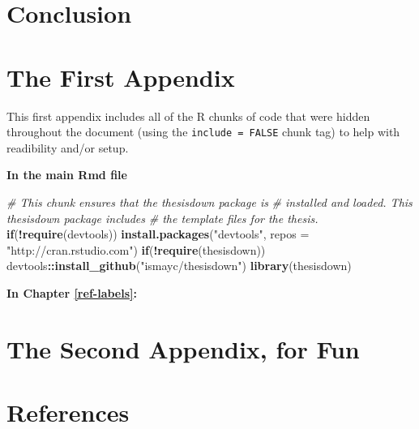 \documentclass[12pt,twoside]{reedthesis}
\newenvironment{Shaded}{\begin{snugshade}}{\end{snugshade}}
\newcommand{\CommentTok}[1]{\textcolor[rgb]{0.56,0.35,0.01}{\textit{#1}}}
\newcommand{\ControlFlowTok}[1]{\textcolor[rgb]{0.13,0.29,0.53}{\textbf{#1}}}
\newcommand{\DataTypeTok}[1]{\textcolor[rgb]{0.13,0.29,0.53}{#1}}
\newcommand{\KeywordTok}[1]{\textcolor[rgb]{0.13,0.29,0.53}{\textbf{#1}}}
\newcommand{\NormalTok}[1]{#1}
\newcommand{\OperatorTok}[1]{\textcolor[rgb]{0.81,0.36,0.00}{\textbf{#1}}}
\newcommand{\StringTok}[1]{\textcolor[rgb]{0.31,0.60,0.02}{#1}}
\begin{document}
\hypertarget{conclusion-2}{%
\chapter*{Conclusion}\label{conclusion-2}}

\appendix

\hypertarget{the-first-appendix}{%
\chapter{The First Appendix}\label{the-first-appendix}}

This first appendix includes all of the R chunks of code that were hidden throughout the document (using the \texttt{include\ =\ FALSE} chunk tag) to help with readibility and/or setup.

\textbf{In the main Rmd file}
\begin{Shaded}
\begin{Highlighting}[]
\CommentTok{# This chunk ensures that the thesisdown package is}
\CommentTok{# installed and loaded. This thesisdown package includes}
\CommentTok{# the template files for the thesis.}
\ControlFlowTok{if}\NormalTok{(}\OperatorTok{!}\KeywordTok{require}\NormalTok{(devtools))}
  \KeywordTok{install.packages}\NormalTok{(}\StringTok{"devtools"}\NormalTok{, }\DataTypeTok{repos =} \StringTok{"http://cran.rstudio.com"}\NormalTok{)}
\ControlFlowTok{if}\NormalTok{(}\OperatorTok{!}\KeywordTok{require}\NormalTok{(thesisdown))}
\NormalTok{  devtools}\OperatorTok{::}\KeywordTok{install_github}\NormalTok{(}\StringTok{"ismayc/thesisdown"}\NormalTok{)}
\KeywordTok{library}\NormalTok{(thesisdown)}
\end{Highlighting}
\end{Shaded}
\textbf{In Chapter \ref{ref-labels}:}

\hypertarget{the-second-appendix-for-fun}{%
\chapter{The Second Appendix, for Fun}\label{the-second-appendix-for-fun}}

\backmatter

\hypertarget{references}{%
\chapter*{References}\label{references}}
\end{document}
